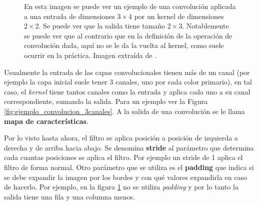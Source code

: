  
\begin{figure}[h]
\noindent
{}
\caption{En esta imagen se puede ver un ejemplo de una convolución aplicada a una entrada de dimensiones $3\times 4$ por un kernel de dimensiones $2\times 2$. Se puede ver que la salida tiene tamaño $2\times 3$. Notablemente se puede ver que al contrario que en la definición de la operación de convolución dada, aquí no se le da la vuelta al kernel, como suele ocurrir en la práctica. Imagen extraída de \cite{Goodfellow-et-al-2016}.}
\label{fig:ejemplo_convolucion}
\end{figure}

Usualmente la entrada de las capas convolucionales tienen más de un canal (por ejemplo la capa inicial suele tener 3 canales, uno por cada color primario), en tal caso, el \textit{kernel} tiene tantos canales como la entrada y aplica cada uno a su canal correspondiente, sumando la salida. Para un ejemplo ver la Figura \ref{fig:ejemplo_convolucion_3canales}. A la salida de una convolución se le llama \textbf{mapa de características}. 

Por lo visto hasta ahora, el filtro se aplica posición a posición de izquierda a derecha y de arriba hacia abajo. Se denomina \textbf{stride} al parámetro que determina cada cuantas posiciones se aplica el filtro. Por ejemplo un stride de 1 aplica el filtro de forma normal. Otro parámetro que se utiliza es el \textbf{padding} que indica si se debe expandir la imagen por los bordes y con qué valores expandirla en caso de hacerlo. Por ejemplo, en la figura \ref{fig:ejemplo_convolucion} no se utiliza \textit{padding} y por lo tanto la salida tiene una fila y una columna menos.


